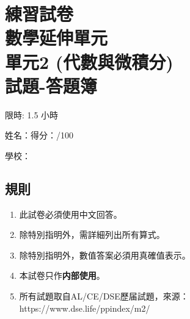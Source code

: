 \documentclass[12pt]{article}
\begin{document}
    \thispagestyle{plain}

    \centering 

    \section*{練習試卷\\數學延伸單元\\單元2 (代數與微積分)\\試題-答題簿}

    限時: 1.5 小時

    姓名：\hrulefill \hfill 得分：\hrulefill/100

    學校：\hrulefill

    \raggedright

    \subsection*{規則}

    \begin{enumerate}
        \item 此試卷必須使用中文回答。
        \item 除特別指明外，需詳細列出所有算式。
        \item 除特別指明外，數值答案必須用真確值表示。
        \item 本試卷只作\textbf{内部使用}。
        \item 所有試題取自AL/CE/DSE歷届試題，來源： https://www.dse.life/ppindex/m2/
    \end{enumerate}
\end{document}
